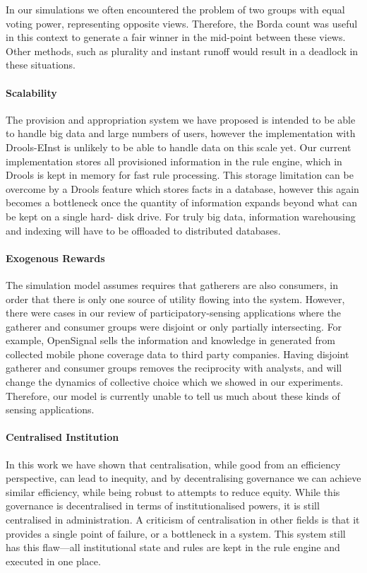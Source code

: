 In our simulations we often encountered the problem of two groups with equal
voting power, representing opposite views. Therefore, the Borda count was
useful in this context to generate a fair winner in the mid-point between
these views. Other methods, such as plurality and instant runoff would result
in a deadlock in these situations.

\paragraph{Scalability} The provision and appropriation system we have
proposed is intended to be able to handle big data and large numbers of users,
however the implementation with Drools-EInst is unlikely to be able to handle
data on this scale yet. Our current implementation stores all provisioned
information in the rule engine, which in Drools is kept in memory for fast
rule processing. This storage limitation can be overcome by a Drools feature
which stores facts in a database, however this again becomes a bottleneck once
the quantity of information expands beyond what can be kept on a single hard-
disk drive. For truly big data, information warehousing and indexing will have
to be offloaded to distributed databases.

\paragraph{Exogenous Rewards} The simulation model assumes requires that
gatherers are also consumers, in order that there is only one source of
utility flowing into the system. However, there were cases in our review of
participatory-sensing applications where the gatherer and consumer groups were
disjoint or only partially intersecting. For example, OpenSignal sells the
information and knowledge in generated from collected mobile phone coverage
data to third party companies. Having disjoint gatherer and consumer groups
removes the reciprocity with analysts, and will change the dynamics of
collective choice which we showed in our experiments. Therefore, our model is
currently unable to tell us much about these kinds of sensing applications.

\paragraph{Centralised Institution} In this work we have shown that
centralisation, while good from an efficiency perspective, can lead to
inequity, and by decentralising governance we can achieve similar efficiency,
while being robust to attempts to reduce equity. While this governance is
decentralised in terms of institutionalised powers, it is still centralised in
administration. A criticism of centralisation in other fields is that it
provides a single point of failure, or a bottleneck in a system. This system
still has this flaw---all institutional state and rules are kept in the rule
engine and executed in one place.

